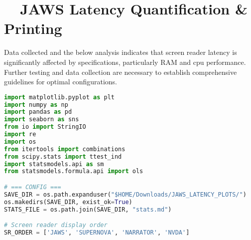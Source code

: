 \section{~~JAWS Latency Quantification \& Printing}
Data collected and the below analysis indicates that screen reader latency is significantly affected by  specifications, particularly RAM and \gls{cpu} performance. Further testing and data collection are necessary to establish comprehensive guidelines for optimal configurations.

\begin{lstlisting}[language=python]
import matplotlib.pyplot as plt
import numpy as np
import pandas as pd
import seaborn as sns
from io import StringIO
import re
import os
from itertools import combinations
from scipy.stats import ttest_ind
import statsmodels.api as sm
from statsmodels.formula.api import ols

# === CONFIG ===
SAVE_DIR = os.path.expanduser("$HOME/Downloads/JAWS_LATENCY_PLOTS/")
os.makedirs(SAVE_DIR, exist_ok=True)
STATS_FILE = os.path.join(SAVE_DIR, "stats.md")

# Screen reader display order
SR_ORDER = ['JAWS', 'SUPERNOVA', 'NARRATOR', 'NVDA']


\end{lstlisting}
